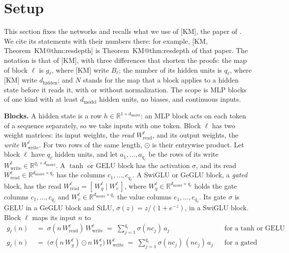 \documentclass[10pt]{article}
\makeatletter
\theoremstyle{definition}
\theoremstyle{remark}
\newcommand{\R}{\mathbb{R}}
\newcommand{\Wread}{W_{\mathrm{read}}}
\newcommand{\Wwrite}{W_{\mathrm{write}}}
\newcommand{\dm}{d_{\mathrm{model}}}
\newcommand{\dhid}{d_{\mathrm{hidden}}}
\newcommand{\para}[1]{\smallskip\noindent\textbf{#1}\hspace{0.5em}}
\newcommand{\KMn}[1]{\csname KM@#1\endcsname}
\newcommand{\KM}[2]{[KM, #1~\KMn{#2}]}
\makeatother
\begin{document}
\section{Setup}\label{sec:setup}
This section fixes the networks and recalls what we use of [KM], the paper of \citet{karbevski2026atleast}. We cite its statements with their numbers there: for example, \KM{Theorem}{thm:resdepth} is Theorem~\KMn{thm:resdepth} of that paper. The notation is that of [KM], with three differences that shorten the proofs: the map of block $\ell$ is $g_\ell$, where [KM] write $B_\ell$; the number of its hidden units is $q_\ell$, where [KM] write $\dhid$; and $N$ stands for the map that a block applies to a hidden state before it reads it, with or without normalization. The scope is MLP blocks of one kind with at least $\dm$ hidden units, no biases, and continuous inputs.

\para{Blocks.} A hidden state is a row $h \in \R^{1\times\dm}$: an MLP block acts on each token of a sequence separately, so we take inputs with one token. Block $\ell$ has two weight matrices: its input weights, the \emph{read} $\Wread^{\ell}$, and its output weights, the \emph{write} $\Wwrite^{\ell}$. For two rows of the same length, $\odot$ is their entrywise product. Let block $\ell$ have $q_\ell$ hidden units, and let $a_1, \dots, a_{q_\ell}$ be the rows of its write $\Wwrite^{\ell} \in \R^{q_\ell\times\dm}$. A $\tanh$ or GELU block has the activation $\sigma$, and its read $\Wread^{\ell} \in \R^{\dm\times q_\ell}$ has the columns $c_1, \dots, c_{q_\ell}$. A SwiGLU or GeGLU block, a \emph{gated} block, has the read $\Wread^{\ell} = [\,W_g^{\ell} \mid W_v^{\ell}\,]$, where $W_g^{\ell} \in \R^{\dm\times q_\ell}$ holds the gate columns $c_1, \dots, c_{q_\ell}$ and $W_v^{\ell} \in \R^{\dm\times q_\ell}$ the value columns $e_1, \dots, e_{q_\ell}$. Its gate $\sigma$ is GELU in a GeGLU block and SiLU, $\sigma(z) = z/(1 + e^{-z})$, in a SwiGLU block. Block $\ell$ maps its input $n$ to
\begin{align*}
g_\ell(n) \;&=\; \sigma(n\,\Wread^{\ell})\,\Wwrite^{\ell} \;=\; \sum_{j=1}^{q_\ell}\sigma(nc_j)\,a_j && \text{for a $\tanh$ or GELU block,}\\
g_\ell(n) \;&=\; \big(\sigma(n\,W_g^{\ell})\odot n\,W_v^{\ell}\big)\,\Wwrite^{\ell} \;=\; \sum_{j=1}^{q_\ell}\sigma(nc_j)\,(ne_j)\,a_j && \text{for a gated block.}
\end{align*}
\end{document}

